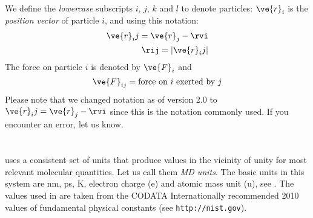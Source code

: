 We define the {\em lowercase} subscripts 
$i$, $j$, $k$ and $l$ to denote particles:
$\ve{r}_i$ is the {\em position vector} of particle $i$, and using this 
notation:
\begin{eqnarray}
\ve{r}_ij	=	\ve{r}_j-\rvi	\\
\rij	=	| \ve{r}_ij |
\end{eqnarray}
The force on particle $i$ is denoted by $\ve{F}_i$ and 
\begin{equation}
\ve{F}_{ij} = \mbox{force on $i$ exerted by $j$}
\end{equation}
Please note that we changed notation as of version 2.0 to $\ve{r}_ij=\ve{r}_j-\rvi$ since this
is the notation commonly used. If you encounter an error, let us know.

\section{}
{\gromacs} uses a consistent set of units that produce values in the
vicinity of unity for most relevant molecular quantities. Let us call
them {\em MD units}. The basic units in this system are nm, ps, K,
electron charge (e) and atomic mass unit (u), see
. The values used in {\gromacs}  are taken from the
CODATA Internationally recommended 2010 values of 
fundamental physical constants (see \verb+http://nist.gov+).

